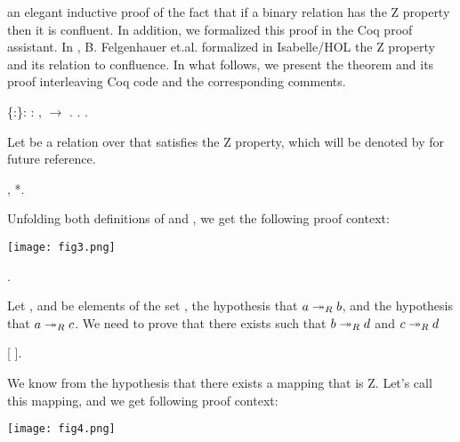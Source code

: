     an elegant inductive proof of the fact that if a binary relation
    has the Z property then it is confluent. In addition, we
    formalized this proof in the Coq proof assistant. In
    \cite{zproperty}, B. Felgenhauer et.al. formalized in Isabelle/HOL 
    the Z property and its relation to confluence. 
    In what follows, we present the theorem
    and its proof interleaving Coq code and the corresponding
    comments. \begin{coqdoccode}
\coqdocemptyline
\coqdocnoindent
{}  \{:\}: \coqdockw{\ensuremath{\forall}} :  ,   \ensuremath{\rightarrow}  .\coqdoceol
\coqdocnoindent
{}.\coqdoceol
\coqdocindent{1.00em}
  . \end{coqdoccode}
Let  be a relation over  that satisfies
    the Z property, which will be denoted by  for future
    reference. \begin{coqdoccode}
\coqdocemptyline
\coqdocindent{1.00em}
 ,   *. \end{coqdoccode}
Unfolding both definitions of
   and , we get the following proof context:


      \texttt{[image: fig3.png]} \begin{coqdoccode}
\coqdocemptyline
\coqdocindent{1.00em}
     . \end{coqdoccode}
Let ,  and  be elements of
     the set ,  the hypothesis that $a \twoheadrightarrow_R b$, and
      the hypothesis that $a\twoheadrightarrow_R c$. We need to prove that
     there exists  such that $b\twoheadrightarrow_R d$ and $c\twoheadrightarrow_R d$ \begin{coqdoccode}
\coqdocemptyline
\coqdocindent{1.00em}
   [ ]. \end{coqdoccode}
We know from the hypothesis
      that there exists a mapping  that is Z. Let's call
      this mapping, and we get following proof context:


      \texttt{[image: fig4.png]}


